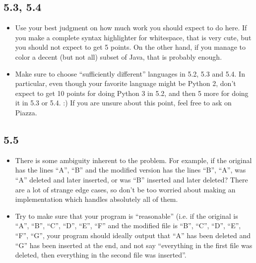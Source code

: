 \documentclass[english]{article}
\begin{document}




\subsection{5.3, 5.4}
\begin{itemize}

\item Use your best judgment on how much work you should expect to do here. If you make a complete syntax highlighter for whitespace, that is very cute, but you should not expect to get 5 points. On the other hand, if you manage to color a decent (but not all) subset of Java, that is probably enough. 
\item Make sure to choose ``sufficiently different'' languages in 5.2, 5.3 and 5.4. In particular, even though your favorite language might be Python 2, don't expect to get 10 points for doing Python 3 in 5.2, and then 5 more for doing it in 5.3 or 5.4. :) If you are unsure about this point, feel free to ask on Piazza.

\end{itemize}

\subsection{5.5}
\begin{itemize}
\item There is some ambiguity inherent to the problem. For example, if the original has the lines ``A'', ``B'' and the modified version has the lines ``B'', ``A'', was ``A'' deleted and later inserted, or was ``B'' inserted and later deleted? There are a lot of strange edge cases, so don't be too worried about making an implementation which handles absolutely all of them.
\item Try to make sure that your program is ``reasonable'' (i.e. if the original is ``A'', ``B'', ``C'', ``D'', ``E'', ``F'' and the modified file is ``B'', ``C'', ``D'', ``E'', ``F'', ``G'', your program should ideally output that ``A'' has been deleted and ``G'' has been inserted at the end, and not say ``everything in the first file was deleted, then everything in the second file was inserted''.
\end{itemize}
\end{document}
